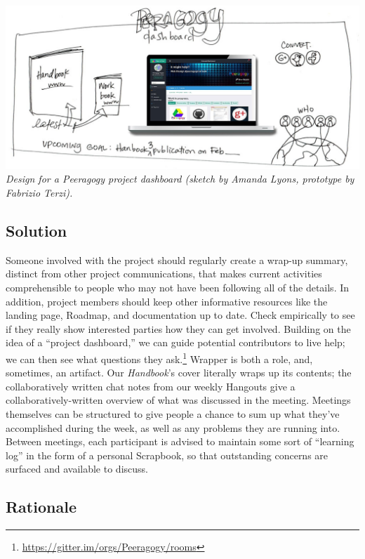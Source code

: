 \includegraphics{images/dashboard_design.jpg} \emph{Design for a
Peeragogy project dashboard (sketch by Amanda Lyons, prototype by
Fabrizio Terzi).}

\hypertarget{solution}{%
\subsection{Solution}\label{solution}}

Someone involved with the project should regularly create a wrap-up
summary, distinct from other project communications, that makes current
activities comprehensible to people who may not have been following all
of the details. In addition, project members should keep other
informative resources like the landing page, {{Roadmap}}, and
documentation up to date. Check empirically to see if they really show
interested parties how they can get involved. Building on the idea of a
``project dashboard,'' we can guide potential contributors to live help;
we can then see what questions they ask.\footnote{\url{https://gitter.im/orgs/Peeragogy/rooms}}
{{Wrapper}} is both a role, and, sometimes, an artifact. Our
\emph{Handbook}'s cover literally wraps up its contents; the
collaboratively written chat notes from our weekly Hangouts give a
collaboratively-written overview of what was discussed in the meeting.
Meetings themselves can be structured to give people a chance to sum up
what they've accomplished during the week, as well as any problems they
are running into. Between meetings, each participant is advised to
maintain some sort of ``learning log'' in the form of a personal
{{Scrapbook}}, so that outstanding concerns are surfaced and available
to discuss.

\hypertarget{rationale}{%
\subsection{Rationale}\label{rationale}}

